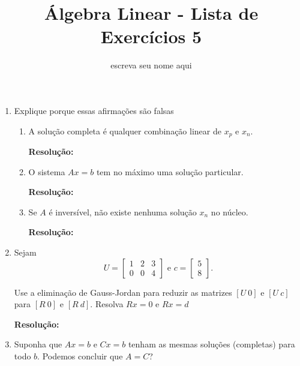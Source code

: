 \documentclass[leqno]{article}
\title{Álgebra Linear - Lista de Exercícios 5}
\author{escreva seu nome aqui}
\date{}
\numberwithin{equation}{section}
\newenvironment{sol}
{
    \vspace{4mm}
    \noindent\textbf{Resolução:}
    \strut\newline
    \smallskip
    \hspace{-3.5mm}
}
{}
\begin{document}
\maketitle

\begin{enumerate}

    \item Explique porque essas afirmações são falsas

        \begin{enumerate}

            \item A solução completa é qualquer combinação linear de $x_p$ e $x_n$.

	\begin{sol} 
	\end{sol} 

            \item O sistema $Ax = b$ tem no máximo uma solução particular.

	\begin{sol} 
	\end{sol} 

            \item Se $A$ é inversível, não existe nenhuma solução $x_n$ no núcleo.

	\begin{sol} 
	\end{sol} 

        \end{enumerate}

    \item Sejam
        $$U = \begin{bmatrix} 
            1 & 2 & 3 \\
            0 & 0 & 4
            \end{bmatrix} \mbox{ e } c = \begin{bmatrix} 
            5 \\
            8
        \end{bmatrix}.$$

        Use a eliminação de Gauss-Jordan para reduzir as matrizes $[U \ 0]$ e $[U \ c]$ para $[R \ 0]$ e $[R \ d]$. Resolva $Rx = 0$ e $Rx = d$

	\begin{sol} 
	\end{sol} 

    \item Suponha que $Ax = b$ e $Cx = b$ tenham as mesmas soluções (completas) para todo $b$. Podemos concluir que $A = C$?


\end{enumerate}
\end{document}
